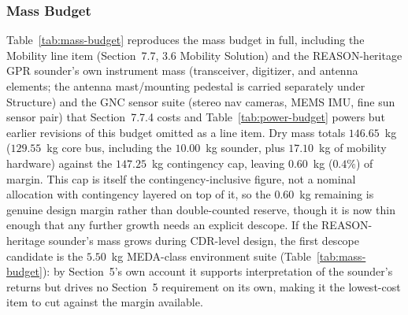 \documentclass[11pt]{article}
\begin{document}
\subsubsection{Mass Budget}
Table~\ref{tab:mass-budget} reproduces the mass budget in full, including the Mobility line item
(Section~7.7, 3.6 Mobility Solution) and the REASON-heritage GPR sounder's own instrument mass
(transceiver, digitizer, and antenna elements; the antenna mast/mounting pedestal is carried
separately under Structure) and the GNC sensor suite (stereo nav cameras, MEMS IMU, fine sun
sensor pair) that Section~7.7.4 costs and Table~\ref{tab:power-budget} powers but earlier
revisions of this budget omitted as a line item. Dry mass totals $146.65$~kg ($129.55$~kg core
bus, including the $10.00$~kg sounder, plus $17.10$~kg of mobility hardware) against the
$147.25$~kg contingency cap, leaving $0.60$~kg ($0.4\%$) of margin. This cap is itself the
contingency-inclusive figure, not a nominal allocation with contingency layered on top of it, so
the $0.60$~kg remaining is genuine design margin rather than double-counted reserve, though it is
now thin enough that any further growth needs an explicit descope. If the REASON-heritage sounder's mass
grows during CDR-level design, the first descope candidate is the $5.50$~kg MEDA-class
environment suite (Table~\ref{tab:mass-budget}): by Section~5's own account it supports
interpretation of the sounder's returns but drives no Section~5 requirement on its own, making it
the lowest-cost item to cut against the margin available.
\end{document}
